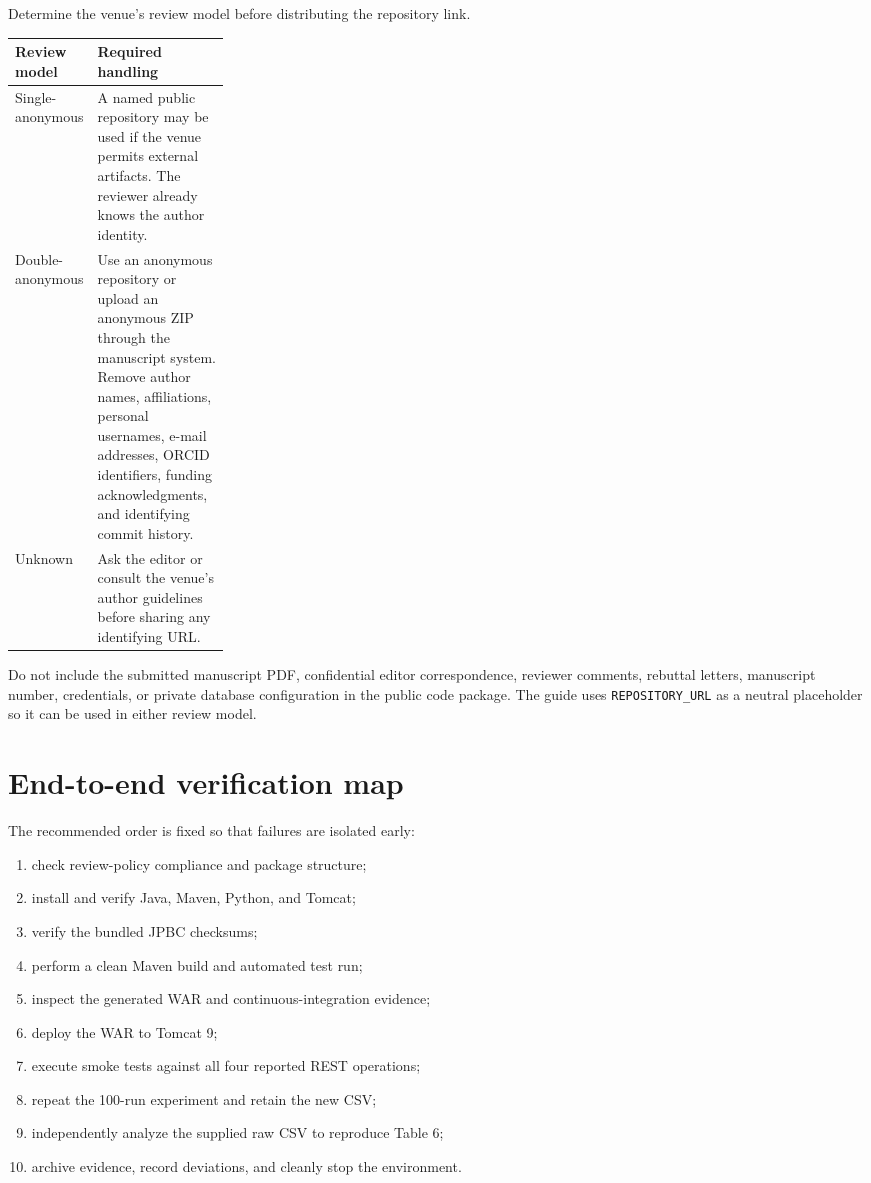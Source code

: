 \documentclass[11pt,a4paper]{article}
\begin{document}
Determine the venue's review model before distributing the repository link.

\begin{tabularx}{\linewidth}{@{}p{0.25\linewidth}X@{}}
\toprule
\textbf{Review model} & \textbf{Required handling} \\
\midrule
Single-anonymous & A named public repository may be used if the venue permits external artifacts. The reviewer already knows the author identity. \\
Double-anonymous & Use an anonymous repository or upload an anonymous ZIP through the manuscript system. Remove author names, affiliations, personal usernames, e-mail addresses, ORCID identifiers, funding acknowledgments, and identifying commit history. \\
Unknown & Ask the editor or consult the venue's author guidelines before sharing any identifying URL. \\
\bottomrule
\end{tabularx}

Do not include the submitted manuscript PDF, confidential editor correspondence, reviewer comments, rebuttal letters, manuscript number, credentials, or private database configuration in the public code package. The guide uses \texttt{REPOSITORY\_URL} as a neutral placeholder so it can be used in either review model.

\section{End-to-end verification map}

The recommended order is fixed so that failures are isolated early:

\begin{enumerate}
  \item check review-policy compliance and package structure;
  \item install and verify Java, Maven, Python, and Tomcat;
  \item verify the bundled JPBC checksums;
  \item perform a clean Maven build and automated test run;
  \item inspect the generated WAR and continuous-integration evidence;
  \item deploy the WAR to Tomcat 9;
  \item execute smoke tests against all four reported REST operations;
  \item repeat the 100-run experiment and retain the new CSV;
  \item independently analyze the supplied raw CSV to reproduce Table 6;
  \item archive evidence, record deviations, and cleanly stop the environment.
\end{enumerate}
\end{document}
